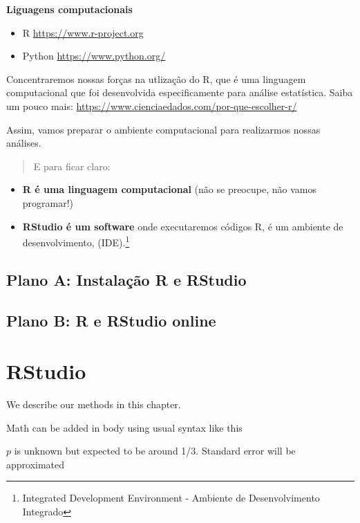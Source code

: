 \documentclass[
]{book}
\begin{document}
\textbf{Liguagens computacionais}

\begin{itemize}
\item
  R \url{https://www.r-project.org}
\item
  Python \url{https://www.python.org/}
\end{itemize}

Concentraremos nossas forças na utlização do R, que é uma linguagem computacional que foi desenvolvida especificamente para análise estatística. Saiba um pouco mais: \url{https://www.cienciaedados.com/por-que-escolher-r/}

Assim, vamos preparar o ambiente computacional para realizarmos nossas análises.

\begin{quote}
E para ficar claro:
\end{quote}

\begin{itemize}
\item
  \textbf{R é uma linguagem computacional} (não se preocupe, não vamos programar!)
\item
  \textbf{RStudio é um software} onde executaremos códigos R, é um ambiente de desenvolvimento, (IDE).\footnote{Integrated Development Environment - Ambiente de Desenvolvimento Integrado}
\end{itemize}

\hypertarget{plano-a-instalauxe7uxe3o-r-e-rstudio}{%
\section{Plano A: Instalação R e RStudio}\label{plano-a-instalauxe7uxe3o-r-e-rstudio}}

\hypertarget{plano-b-r-e-rstudio-online}{%
\section{Plano B: R e RStudio online}\label{plano-b-r-e-rstudio-online}}

\hypertarget{rstudio}{%
\chapter{RStudio}\label{rstudio}}

We describe our methods in this chapter.

Math can be added in body using usual syntax like this

\(p\) is unknown but expected to be around 1/3. Standard error will be approximated
\end{document}
